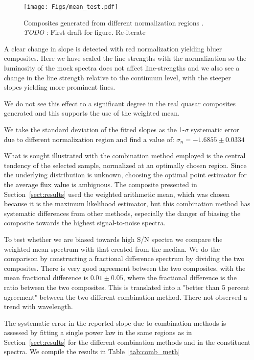 \documentclass{aa}    %
\newcommand{\figlabel}[1]{\label{fig:#1}}
\newcommand{\Tab}[1]{Table~\ref{tab:#1}}
\newcommand{\tab}[1]{\Tab{#1}}
\newcommand{\sectionname}{Section}
\newcommand{\Sect}[1]{\sectionname~\ref{sect:#1}}
\newcommand{\sect}[1]{\Sect{#1}}
\newcommand{\todo}[3]{{\color{#2}\emph{#1}: #3}}
\newcommand{\jstodo}[1]{\todo{ \\TODO }{green}{#1}}
\begin{document}
 \begin{figure}[hbtp]
   \centering
   \texttt{[image: Figs/mean\_test.pdf]}
   \caption[]{Composites generated from different normalization regions . \jstodo{First draft for figure. Re-iterate}}
  \figlabel{mean_test}
 \end{figure}


 A clear change in slope is detected with red normalization yielding bluer composites. Here we have scaled the line-strengths with the normalization so the luminosity of the mock spectra does not affect line-strengths and we also see a change in the line strength relative to the continuum level, with the steeper slopes yielding more prominent lines.
 
We do not see this effect to a significant degree in the real quasar composites generated and this supports the use of the weighted mean.

We take the standard deviation of the fitted slopes as the 1-$\sigma$ systematic error due to different normalization region and find a value of: $\sigma_{n} = -1.6855 \pm 0.0334$


What is sought illustrated with the combination method employed is the central tendency of the selected sample, normalized at an optimally chosen region. Since the underlying distribution is unknown, choosing the optimal point estimator for the average flux value is ambiguous. The composite presented in \sect{results} used the weighted arithmetic mean, which was chosen because it is the maximum likelihood estimator, but this combination method has systematic differences from other methods, especially the danger of biasing the composite towards the highest signal-to-noise spectra. 

To test whether we are biased towards high S/N spectra we compare the weighted mean spectrum with that created from the median. We do the comparison by constructing a fractional difference spectrum by dividing the two composites. There is very good agreement between the two composites, with the mean fractional difference is $0.01 \pm 0.05$, where the fractional difference is the ratio between the two composites. This is translated into a "better than 5 percent agreement" between the two different combination method. There not observed a trend with wavelength.

The systematic error in the reported slope due to combination methods is assessed by fitting a single power law in the same regions as in \sect{results} for the different combination methods and in the constituent spectra. We compile the results in \tab{comb_meth}
\end{document}
